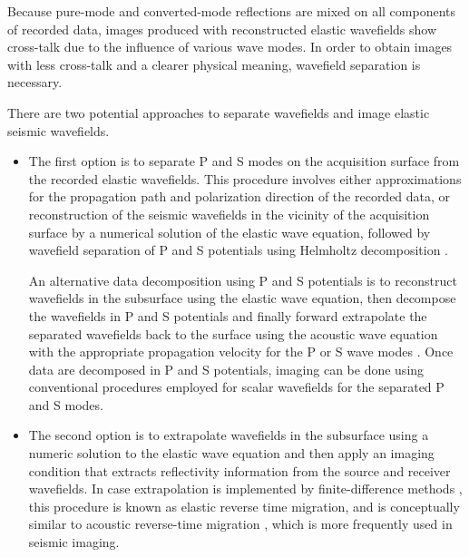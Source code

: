 Because pure-mode and converted-mode reflections are mixed on all components of recorded data, images produced with reconstructed elastic wavefields show cross-talk due to the influence of various wave modes. In order to obtain images with less cross-talk and a clearer physical meaning, wavefield separation is necessary.

There are two potential approaches to separate wavefields and image elastic seismic wavefields.
\begin{itemize}
\item
The first option is to separate P and S modes on the acquisition
surface from the recorded elastic wavefields. This procedure involves
either approximations for the propagation path and 
polarization direction of the recorded data, or reconstruction of
the seismic wavefields in the vicinity of the acquisition surface by a
numerical solution of the elastic wave equation, followed by wavefield
separation of P and S potentials using Helmholtz decomposition \cite[]{SEG-1988-S12.4,GEO62-02-05980613}.

An alternative data decomposition using P and S potentials is to
reconstruct wavefields in the subsurface using the elastic
wave equation, then decompose the wavefields in P and S potentials and
finally forward extrapolate the separated wavefields back to the
surface using the acoustic wave equation with the appropriate
propagation velocity for the P or S wave modes
\cite[]{sun.elastic.rtm}. Once data are decomposed in P and S
potentials, imaging can be done using conventional procedures employed
for scalar wavefields for the separated P and S modes.

\item
The second option is to extrapolate wavefields in the subsurface using
a numeric solution to the elastic wave equation and then apply an
imaging condition that extracts reflectivity information from the
source and receiver wavefields. In case extrapolation is implemented
by finite-difference methods
\cite[]{chang:67,chang:597}, this procedure is known
as elastic reverse time migration, and is conceptually similar to
acoustic reverse-time migration \cite[]{GEO48-11-15141524}, which is
more frequently used in seismic imaging.
\end{itemize}



